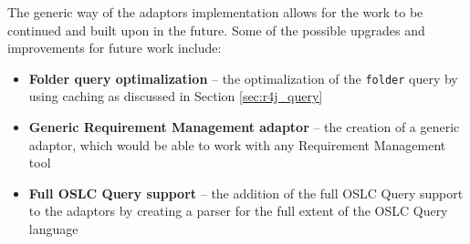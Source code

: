 The generic way of the adaptors implementation allows for the work to be continued and built upon in the future. Some of the possible upgrades and improvements for future work include:

\begin{itemize}
  \item \textbf{Folder query optimalization} -- the optimalization of the \texttt{folder} query by using caching as discussed in Section \ref{sec:r4j_query}
  \item \textbf{Generic Requirement Management adaptor} -- the creation of a generic adaptor, which would be able to work with any Requirement Management tool
  \item \textbf{Full OSLC Query support} -- the addition of the full OSLC Query support to the adaptors by creating a parser for the full extent of the OSLC Query language
\end{itemize}


% 